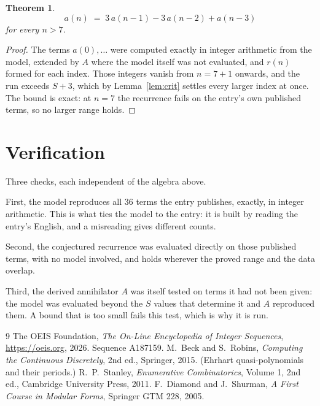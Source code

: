 \documentclass[11pt,a4paper]{article}
\theoremstyle{plain}
\newtheorem{theorem}{Theorem}
\theoremstyle{definition}
\begin{document}
\begin{theorem}
\[
a(n)\;=\;3\,a(n-1) - 3\,a(n-2) + a(n-3)
\]
for every $n>7$.
\end{theorem}

\begin{proof}
The terms $a(0),\dots$ were computed exactly in integer arithmetic from the model, extended by
$A$ where the model itself was not evaluated, and $r(n)$ formed for each index. Those integers
vanish from $n=7+1$ onwards, and the run exceeds $S+3$, which by
Lemma~\ref{lem:crit} settles every larger index at once. The bound is exact: at $n=7$ the recurrence fails on the entry's own published terms, so no larger range holds.
\end{proof}

\section{Verification}

Three checks, each independent of the algebra above.

First, the model reproduces all $36$ terms the entry publishes, exactly, in integer
arithmetic. This is what ties the model to the entry: it is built by reading the entry's
English, and a misreading gives different counts.

Second, the conjectured recurrence was evaluated directly on those published terms, with no
model involved, and holds wherever the proved range and the data overlap.

Third, the derived annihilator $A$ was itself tested on terms it had not been given: the model
was evaluated beyond the $S$ values that determine it and $A$ reproduced them. A bound that is
too small fails this test, which is why it is run.

\begin{thebibliography}{9}
 The OEIS Foundation, \emph{The On-Line Encyclopedia of Integer
Sequences}, \url{https://oeis.org}, 2026. Sequence A187159.
 M.~Beck and S.~Robins, \emph{Computing the Continuous Discretely},
2nd ed., Springer, 2015. (Ehrhart quasi-polynomials and their periods.)
 R.~P.~Stanley, \emph{Enumerative Combinatorics}, Volume 1, 2nd ed.,
Cambridge University Press, 2011.
 F.~Diamond and J.~Shurman, \emph{A First Course in Modular Forms},
Springer GTM 228, 2005.
\end{thebibliography}
\end{document}
